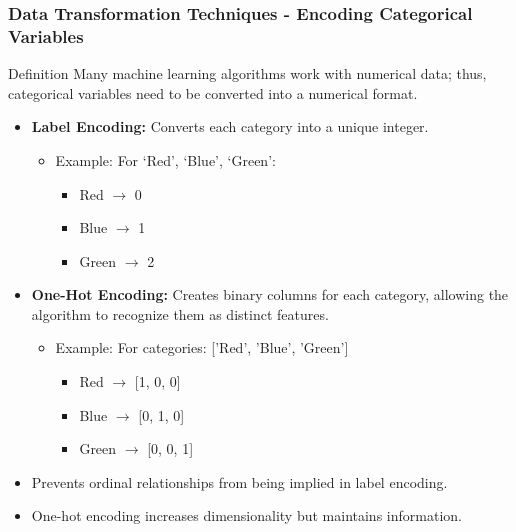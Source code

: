 \documentclass[aspectratio=169]{beamer}
\begin{document}
\begin{frame}[fragile]
    \frametitle{Data Transformation Techniques - Encoding Categorical Variables}
    \begin{block}{Definition}
        Many machine learning algorithms work with numerical data; thus, categorical variables need to be converted into a numerical format.
    \end{block}
    
    \begin{itemize}
        \item \textbf{Label Encoding:} Converts each category into a unique integer.
        \begin{itemize}
            \item Example: For ‘Red’, ‘Blue’, ‘Green’:
            \begin{itemize}
                \item Red $\rightarrow$ 0
                \item Blue $\rightarrow$ 1
                \item Green $\rightarrow$ 2
            \end{itemize}
        \end{itemize}
        
        \item \textbf{One-Hot Encoding:} Creates binary columns for each category, allowing the algorithm to recognize them as distinct features.
        \begin{itemize}
            \item Example: For categories: ['Red', 'Blue', 'Green']
            \begin{itemize}
                \item Red $\rightarrow$ [1, 0, 0]
                \item Blue $\rightarrow$ [0, 1, 0]
                \item Green $\rightarrow$ [0, 0, 1]
            \end{itemize}
        \end{itemize}
    \end{itemize}

    \begin{itemize}
        \item Prevents ordinal relationships from being implied in label encoding.
        \item One-hot encoding increases dimensionality but maintains information.
    \end{itemize}
\end{frame}
\end{document}
